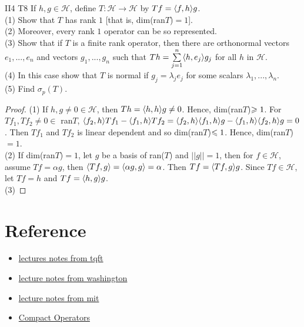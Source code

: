\begin{exercise}{II4 T8}{}
    If $h,g\in\mathscr{H}$,
    define $T:\mathscr{H}\rightarrow \mathscr{H}$ by $Tf=\langle f,h\rangle g$.\\
    (1) Show that $T$ has rank $1$ [that is, dim(ran$T$)$=1$].\\
    (2) Moreover, every rank $1$ operator can be so represented.\\
    (3) Show that if $T$ is a finite rank operator, then there are orthonormal vectors
    $e_1,...,e_n$ and vectors $g_1,...,g_n$ such that $Th=\sum\limits_{j=1}^{n}\langle h,e_j\rangle g_j$
    for all $h$ in $\mathscr{H}$. \\
    (4)  In this case show that
    $T$ is normal if $g_j=\lambda_je_j$ for some scalars $\lambda_1,...,\lambda_n$.\\
    (5) Find $\sigma_p(T)$.
\end{exercise}

\begin{proof}
    (1) If $h,g\neq 0\in\mathscr{H}$, then $Th=\langle h,h\rangle g\neq 0$. Hence, dim(ran$T$)$\geqslant 1$.
    For $Tf_1,Tf_2\neq 0\in$ ran$T$, $\langle f_2,h\rangle Tf_1-\langle f_1,h\rangle Tf_2=\langle f_2,h\rangle\langle f_1,h\rangle g-\langle f_1,h\rangle\langle f_2,h\rangle g=0$.
    Then $Tf_1$ and $Tf_2$ is linear dependent and so dim(ran$T$)$\leqslant 1$.
    Hence, dim(ran$T$)$=1$.\\
    (2) If dim(ran$T$)$=1$, let $g$ be a basis of ran($T$) and $||g||=1$, then for $f\in\mathscr{H}$,
    assume $Tf=\alpha g$, then $\langle Tf,g\rangle=\langle\alpha g,g\rangle=\alpha$. Then $Tf=\langle Tf,g\rangle g$. 
    Since $Tf\in\mathscr{H}$, let $Tf=h$ and $Tf=\langle h,g\rangle g$.\\
    (3) 
\end{proof}


\section{Reference}
\begin{itemize}
    \item \href{https://tqft.net/web/teaching/current/Analysis3/LectureNotes/03.Compact.operators.pdf}{lectures notes from tqft}
    \item \href{https://sites.math.washington.edu//~hart/m556/notes1.pdf}{lecture notes from washington}
    \item \href{https://ocw.mit.edu/courses/18-102-introduction-to-functional-analysis-spring-2021/resources/mit18_102s21_lec19/}{lecture notes from mit}
    \item \href{https://www.lakeheadu.ca/sites/default/files/uploads/77/Nielsen.pdf}{Compact Operators}
\end{itemize}